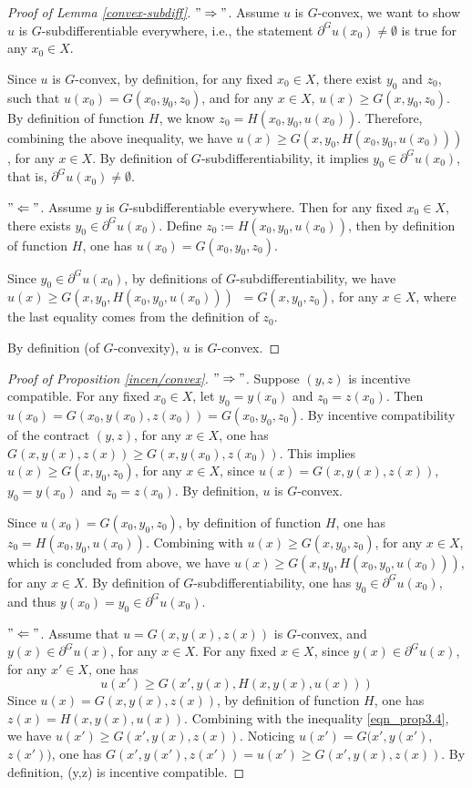 \documentclass[a4paper, 11pt]{amsart}
\numberwithin{equation}{section}
\theoremstyle{plain}
\theoremstyle{definition}
\theoremstyle{remark}
\begin{document}
\begin{proof}[Proof of Lemma \ref{convex-subdiff}]
$"\Rightarrow"$. Assume $u$ is $G$-convex, we want to show $u$ is $G$-subdifferentiable everywhere, i.e., the statement $\partial^G u(x_0)\neq \emptyset$ is true for any $ x_0\in X$.

Since $u$ is $G$-convex, by definition, for any fixed $x_0 \in X$, there exist $y_0$ and $z_0$, such that $u(x_0) = G(x_0,y_0,z_0)$, and for any $x \in X$, $u(x)\ge G(x, y_0, z_0)$. By definition of function $H$, we know $z_0 = H(x_0,y_0,u(x_0))$. Therefore, combining the above inequality, we have $u(x) \ge G(x, y_0, H(x_0,y_0,u(x_0)))$, for any $x \in X$. By definition of $G$-subdifferentiability, it implies $y_0 \in \partial^G u(x_0)$, that is, $\partial^G u(x_0) \neq \emptyset$.


$"\Leftarrow"$. Assume $y$ is $G$-subdifferentiable everywhere. Then for any fixed $x_0 \in X$, there exists $y_0 \in \partial^G u(x_0)$. Define $z_0:=H(x_0,y_0,u(x_0))$, then by definition of function $H$, one has $u(x_0) = G(x_0, y_0, z_0)$.

Since $y_0\in \partial^G u(x_0)$, by definitions of $G$-subdifferentiability, we have $u(x)\ge G(x,y_0,H(x_0,y_0,u(x_0)))$\ $ = G(x,y_0,z_0)$, for any $x\in X$, where the last equality comes from the definition of $z_0$.

By definition (of $G$-convexity), $u$ is $G$-convex.
\end{proof}
\vspace{0.3cm}
\begin{proof}[Proof of Proposition \ref{incen/convex}]
$"\Rightarrow"$. Suppose $(y,z)$ is incentive compatible. For any fixed $x_0 \in X$, let $y_0 = y(x_0)$ and $z_0 = z(x_0)$. Then $u(x_0) = G(x_0, y(x_0), z(x_0)) = G(x_0, y_0, z_0)$. By incentive compatibility of the contract $(y,z)$, for any $x\in X$, one has $G(x, y(x), z(x)) \ge G(x, y(x_0), z(x_0))$. This implies $u(x) \ge G(x,y_0,z_0)$, for any $x\in X$, since $u(x)= G(x, y(x), z(x))$,  $y_0 = y(x_0)$ and $z_0 = z(x_0)$. By definition, $u$ is $G$-convex. 

Since $u(x_0)=G(x_0, y_0, z_0)$, by definition of function $H$, one has $z_0 = H(x_0, y_0, u(x_0))$.  Combining with $u(x) \ge G(x, y_0, z_0)$,  for any $x\in X$, which is concluded from above, we have $u(x)\ge G(x, y_0, H(x_0, y_0, u(x_0)))$, for any $x\in X$. By definition of  $G$-subdifferentiability, one has $y_0 \in \partial^G u(x_0)$, and thus $y(x_0) = y_0 \in \partial^G u(x_0)$.

$"\Leftarrow"$. Assume that $u = G(x, y(x),z(x))$ is $G$-convex, and $y(x)\in \partial^G u(x)$, for any $x\in X$. For any fixed $x \in X$, since $y(x)\in \partial^G u(x)$, for any $x'\in X$, one has 
\begin{equation}\label{eqn_prop3.4}
	u(x')\ge G(x', y(x), H(x, y(x), u(x)))
\end{equation} 
Since $u(x) = G(x, y(x),z(x))$, by definition of function $H$, one has $z(x) = H(x,y(x), u(x))$. Combining with the inequality \eqref{eqn_prop3.4}, we have $u(x')\ge G(x', y(x), z(x))$. Noticing $u(x') = G(x',y(x'),$ $z(x')) $, one has $G(x',y(x'),z(x')) = u(x') \ge G(x', y(x), z(x))$.
By definition, (y,z) is incentive compatible.
\end{proof}
\end{document}
